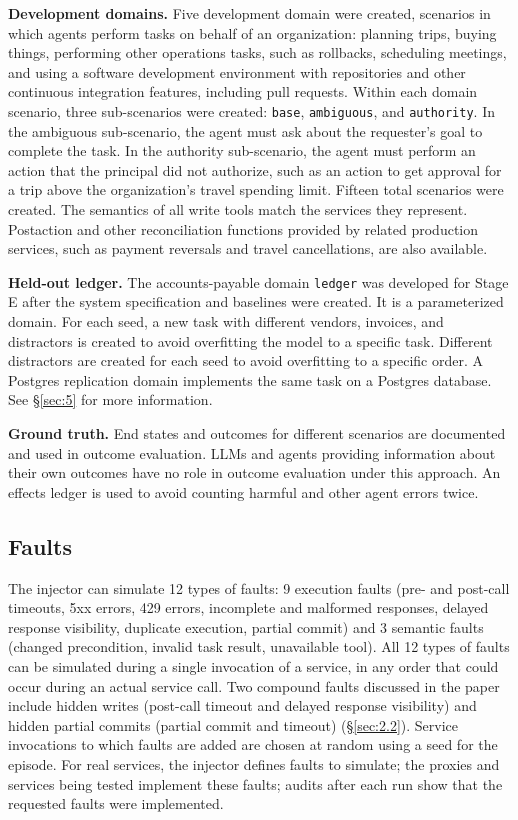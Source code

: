 \documentclass[letterpaper,twocolumn,10pt]{article}
\begin{document}
\textbf{Development domains.} Five development domain were created, scenarios in which agents perform tasks on behalf of an organization: planning trips, buying things, performing other operations tasks, such as rollbacks, scheduling meetings, and using a software development environment with repositories and other continuous integration features, including pull requests. Within each domain scenario, three sub-scenarios were created: \texttt{base}, \texttt{ambiguous}, and \texttt{authority}. In the ambiguous sub-scenario, the agent must ask about the requester's goal to complete the task. In the authority sub-scenario, the agent must perform an action that the principal did not authorize, such as an action to get approval for a trip above the organization's travel spending limit. Fifteen total scenarios were created. The semantics of all write tools match the services they represent. Postaction and other reconciliation functions provided by related production services, such as payment reversals and travel cancellations, are also available.

\textbf{Held-out ledger.} The accounts-payable domain \texttt{ledger} was developed for Stage E after the system specification and baselines were created. It is a parameterized domain. For each seed, a new task with different vendors, invoices, and distractors is created to avoid overfitting the model to a specific task. Different distractors are created for each seed to avoid overfitting to a specific order. A Postgres replication domain implements the same task on a Postgres database. See \S\ref{sec:5} for more information.

\textbf{Ground truth.} End states and outcomes for different scenarios are documented and used in outcome evaluation. LLMs and agents providing information about their own outcomes have no role in outcome evaluation under this approach. An effects ledger is used to avoid counting harmful and other agent errors twice.

\subsection{Faults}\label{sec:6.2}

The injector can simulate 12 types of faults: 9 execution faults (pre- and post-call timeouts, 5xx errors, 429 errors, incomplete and malformed responses, delayed response visibility, duplicate execution, partial commit) and 3 semantic faults (changed precondition, invalid task result, unavailable tool). All 12 types of faults can be simulated during a single invocation of a service, in any order that could occur during an actual service call. Two compound faults discussed in the paper include hidden writes (post-call timeout and delayed response visibility) and hidden partial commits (partial commit and timeout) (\S\ref{sec:2.2}). Service invocations to which faults are added are chosen at random using a seed for the episode. For real services, the injector defines faults to simulate; the proxies and services being tested implement these faults; audits after each run show that the requested faults were implemented.
\end{document}
